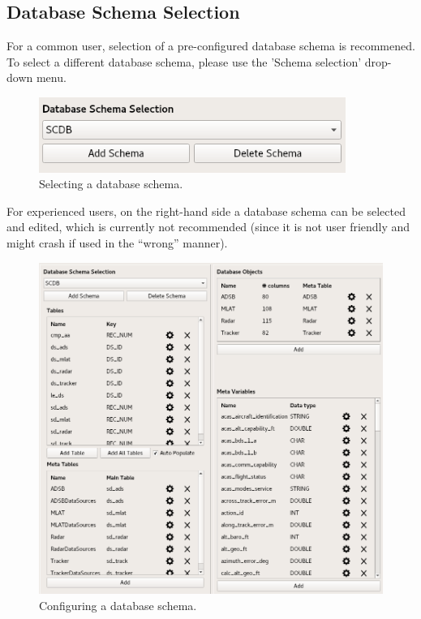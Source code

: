 \documentclass[10pt,letterpaper,extrafontsizes]{memoir}
\begin{document}
\subsection{Database Schema Selection}
For a common user, selection of a pre-configured database schema is recommened. To select a different database schema, please use the 'Schema selection' drop-down menu.\\

\begin{figure}[H]
  \center
    \includegraphics[width=10cm]{../screenshots/database_schema_selection.png}
  \caption{Selecting a database schema.}
  \label{fig:db_schema_select}
\end{figure}

For experienced users, on the right-hand side a database schema can be selected and edited, which is currently not recommended (since it is not user friendly and might crash if used in the ``wrong'' manner).

\begin{figure}[H]
  \hspace*{-1cm}
    \includegraphics[width=16cm]{../screenshots/database_schema_configuration.png}
  \caption{Configuring a database schema.}
  \label{fig:db_schema_configuration}
\end{figure}
\end{document}
